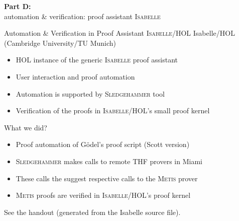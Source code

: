 
\begin{transitionframe}{} \Large \centering
\textbf{Part D:} \\[.5em]
\quad automation \& verification: proof assistant \textsc{Isabelle} \\[2em]
\end{transitionframe}



\begin{frame}{Automation \& Verification in Proof Assistant \textsc{Isabelle/HOL}} \large
Isabelle/HOL   (Cambridge University/TU Munich)
\begin{itemize}
\item HOL instance of the generic \textsc{Isabelle} proof assistant
\item User interaction and proof automation 
\item Automation is supported by \textsc{Sledgehammer} tool
\item Verification of the proofs in \textsc{Isabelle/HOL}'s small proof kernel
\end{itemize}
\vfill
What we did?
\begin{itemize}
\item Proof automation of G\"odel's proof script (Scott version)
\item \textsc{Sledgehammer} makes calls to remote THF provers in Miami
\item These calls the suggest respective calls to the \textsc{Metis} prover
\item \textsc{Metis} proofs are verified in \textsc{Isabelle/HOL}'s proof kernel
\end{itemize}
\vfill
See the handout (generated from the Isabelle source file).
\end{frame}


